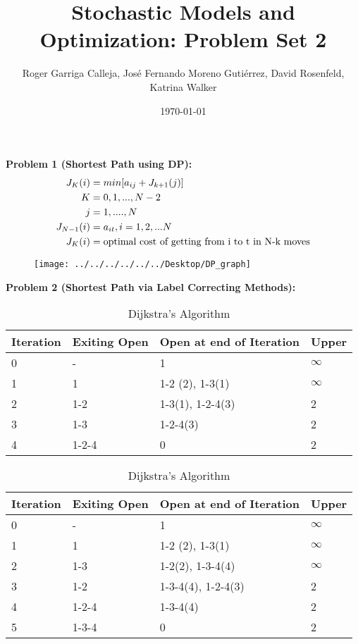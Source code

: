 \documentclass[11pt, english]{article}
\title{Stochastic Models and Optimization: Problem Set 2}
\author{Roger Garriga Calleja, José Fernando Moreno Gutiérrez, David Rosenfeld, Katrina Walker}
\date{\today}
\begin{document}
\maketitle
\textbf{Problem 1 (Shortest Path using DP):}
\\
\begin{align*}
J_K(i) &= min[a_{ij} + J_{k+1}(j)]\\
K & = 0, 1,...,N-2\\
j & = 1,....,N \\
J_{N-1}(i) & = a_{it}, i = 1, 2,...N \\
J_{K}(i)& = \textup{optimal cost of getting from i to t in N-k moves} 
\end{align*}
\begin{center}
\begin{figure}[h]\small
	\centering
	\texttt{[image: ../../../../../../Desktop/DP\_graph]}
\end{figure}
\end{center}
\clearpage
\textbf{Problem 2 (Shortest Path via Label Correcting Methods):}
\begin{table}[h]\small
	\centering
	\caption{Bellman Ford Algorithm}
	\label{my-label}
	\begin{tabular}{llll}
		\hline
		Iteration & Exiting Open & Open at end of Iteration & Upper \\ \hline
		0 & - & 1 & $\infty$ \\ \hline
		1 & 1 & 1-2 (2), 1-3(1) & $\infty$ \\ \hline
		2 & 1-2 & 1-3(1), 1-2-4(3) & 2 \\ \hline
		3 & 1-3 & 1-2-4(3) & 2 \\ \hline
		4 & 1-2-4 & 0 & 2 \\ \hline
	\end{tabular}
	\centering
	\caption{Dijkstra’s Algorithm}
	\label{my-label}
	\begin{tabular}{llll}
		\hline
		Iteration & Exiting Open & Open at end of Iteration & Upper \\ \hline
		0 & - & 1 & $\infty$ \\ \hline
		1 & 1 & 1-2 (2), 1-3(1) & $\infty$ \\ \hline
		2 & 1-3 & 1-2(2),  1-3-4(4) & $\infty$ \\ \hline
		3 & 1-2 & 1-3-4(4), 1-2-4(3) & 2 \\ \hline
		4 & 1-2-4 & 1-3-4(4) & 2 \\ \hline
		5 & 1-3-4 & 0 & 2 \\ \hline
	\end{tabular}
\end{table}
\end{document}

